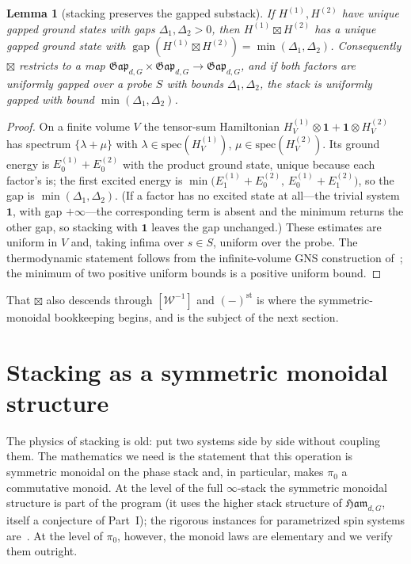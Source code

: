 \documentclass[12pt]{article}
\newcommand{\Ham}{\mathfrak{Ham}}              %
\newcommand{\Gap}{\mathfrak{Gap}}              %
\newcommand{\Weq}{\mathcal{W}}                 %
\newcommand{\st}{\mathrm{st}}                  %
\newcommand{\gapof}[1]{\operatorname{gap}(#1)} %
\newcommand{\gapbound}{\Delta}                  %
\newcommand{\triv}{\mathbf{1}}               %
\newtheorem{lemma}[lemma]{Lemma}
\theoremstyle{definition}
\theoremstyle{remark}
\theoremstyle{plain}
\begin{document}
\begin{lemma}[stacking preserves the gapped substack]
\label{lem:gapstack}
If $H^{(1)},H^{(2)}$ have unique gapped ground states with gaps
$\gapbound_1,\gapbound_2>0$, then $H^{(1)}\boxtimes H^{(2)}$ has a unique gapped
ground state with
$\gapof{H^{(1)}\boxtimes H^{(2)}}=\min(\gapbound_1,\gapbound_2)$. Consequently
$\boxtimes$ restricts to a map $\Gap_{d,G}\times\Gap_{d,G}\to\Gap_{d,G}$, and if
both factors are uniformly gapped over a probe $S$ with bounds
$\gapbound_1,\gapbound_2$, the stack is uniformly gapped with bound
$\min(\gapbound_1,\gapbound_2)$.
\end{lemma}

\begin{proof}
On a finite volume $V$ the tensor-sum Hamiltonian
$H^{(1)}_V\otimes\mathbf 1+\mathbf 1\otimes H^{(2)}_V$ has spectrum
$\{\lambda+\mu\}$ with $\lambda\in\mathrm{spec}(H^{(1)}_V)$,
$\mu\in\mathrm{spec}(H^{(2)}_V)$. Its ground energy is $E^{(1)}_0+E^{(2)}_0$ with
the product ground state, unique because each factor's is; the first excited
energy is $\min\bigl(E^{(1)}_1+E^{(2)}_0,\,E^{(1)}_0+E^{(2)}_1\bigr)$, so the gap
is $\min(\gapbound_1,\gapbound_2)$. (If a factor has no excited state at all---the
trivial system $\triv$, with gap $+\infty$---the corresponding term is absent and
the minimum returns the other gap, so stacking with $\triv$ leaves the gap
unchanged.) These estimates are uniform in $V$ and,
taking infima over $s\in S$, uniform over the probe. The thermodynamic statement
follows from the infinite-volume GNS construction of~\cite{paperGap}; the minimum
of two positive uniform bounds is a positive uniform bound.
\end{proof}

That $\boxtimes$ also descends through $[\Weq^{-1}]$ and $(-)^{\st}$ is where the
symmetric-monoidal bookkeeping begins, and is the subject of the next section.

\section{Stacking as a symmetric monoidal structure}
\label{sec:monoidal}

The physics of stacking is old: put two systems side by side without coupling
them. The mathematics we need is the statement that this operation is
symmetric monoidal on the phase stack and, in particular, makes $\pi_0$ a
commutative monoid. At the level of the full $\infty$-stack the symmetric
monoidal structure is part of the program (it uses the higher stack structure of
$\Ham_{d,G}$, itself a conjecture of Part~I); the rigorous instances for
parametrized spin systems are~\cite{beaudry-etal}. At the level of $\pi_0$,
however, the monoid laws are elementary and we verify them outright.
\end{document}
